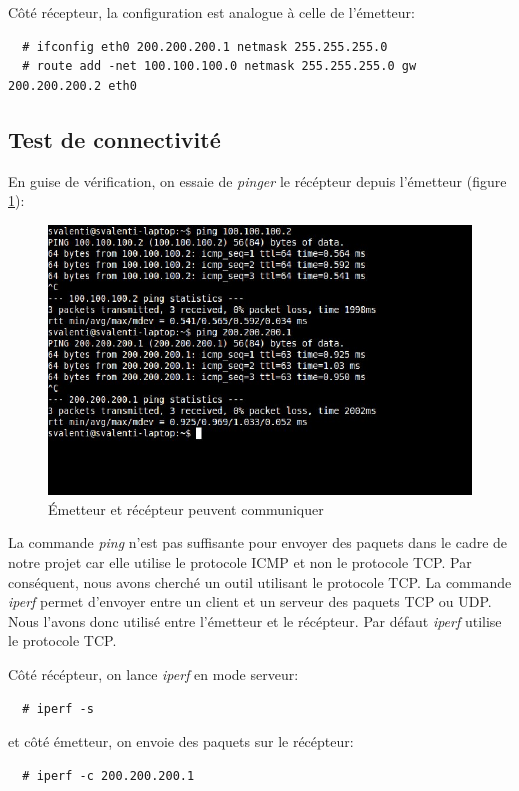 \documentclass[a4paper]{article}
\begin{document}
Côté récepteur, la configuration est analogue à celle de l'émetteur:
\begin{verbatim}
  # ifconfig eth0 200.200.200.1 netmask 255.255.255.0
  # route add -net 100.100.100.0 netmask 255.255.255.0 gw 200.200.200.2 eth0
\end{verbatim}

\subsection{Test de connectivité}
En guise de vérification, on essaie de \textit{pinger} le
récépteur depuis l'émetteur (figure \ref{ping1}):

\begin{figure}[!ht]
	\centering
	\includegraphics[scale=.5]{ping.jpg}
	\caption{\label{ping1} Émetteur et récépteur peuvent communiquer}
\end{figure}

La commande \textit{ping} n'est pas suffisante pour envoyer
des paquets dans le cadre de notre projet car elle utilise
le protocole ICMP et non le protocole TCP. Par conséquent,
nous avons cherché un outil utilisant le protocole TCP.
La commande \textit{iperf} permet d'envoyer entre un client et
un serveur des paquets TCP ou UDP. Nous l'avons donc utilisé
entre l'émetteur et le récépteur. Par défaut \textit{iperf}
utilise le protocole TCP.

Côté récépteur, on lance \textit{iperf} en mode serveur:
\begin{verbatim}
  # iperf -s
\end{verbatim}

et côté émetteur, on envoie des paquets sur le récépteur:
\begin{verbatim}
  # iperf -c 200.200.200.1
\end{verbatim}
\end{document}

